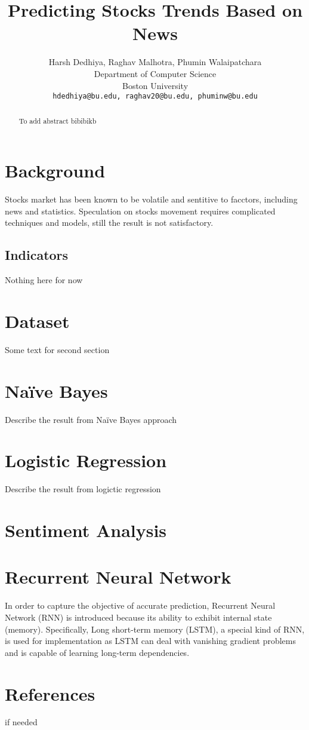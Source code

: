 \documentclass{article}
\title{Predicting Stocks Trends Based on News}
\author{
Harsh Dedhiya, Raghav Malhotra, Phumin Walaipatchara\\
Department of Computer Science\\
Boston University\\
\texttt{hdedhiya@bu.edu, raghav20@bu.edu, phuminw@bu.edu}\\
}
\begin{document}
\maketitle
\begin{abstract}
    To add abstract bibibikb
\end{abstract}
\section{Background}
Stocks market has been known to be volatile and sentitive to facctors, including news and statistics.
 Speculation on stocks movement requires complicated techniques and models, still the result is not
 satisfactory.
\subsection{Indicators}
Nothing here for now 

\section{Dataset}
Some text for second section

\section{Na\"ive Bayes}
Describe the result from Na\"ive Bayes approach

\section{Logistic Regression}
Describe the result from logictic regression

\section{Sentiment Analysis}

\section{Recurrent Neural Network}
In order to capture the objective of accurate prediction, Recurrent Neural Network (RNN) is introduced
 because its ability to exhibit internal state (memory). Specifically, Long short-term memory (LSTM),
 a special kind of RNN, is used for implementation as LSTM can deal with vanishing gradient problems
 and is capable of learning long-term dependencies.

\section*{References}
if needed
\end{document}
